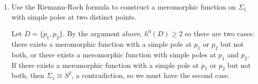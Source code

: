 \documentclass[11pt,oneside,english,reqno]{amsart}
\theoremstyle{definition}
\newcommand{\pspace}{\hspace{10mm}}
\begin{document}
\begin{enumerate}[leftmargin=*]
\begin{proof}
Let $D=\{p\}$. By the Riemann-Roch formula, we have
\[
h^0(D)-h^1(D)=d-g+1=d+1\pspace \iff \pspace h^0(D)=h^1(D)+d+1\geq1.
\]
The space of holomorphic functions (functions with not poles) has dimension 1, so it must be the case that $h^(0)\geq2$. Thus there exists at least one meromorphic function on $\Sigma_0$ with a simple pole at $p$.
\end{proof}

\pagebreak

\item Use the Riemann-Roch formula to construct a meromorphic function on $\Sigma_1$ with simple poles at two distinct points. 

Let $D=\{p_1,p_2\}$. By the argument above, $h^0(D)\geq2$ so there are two cases: there exists a meromorphic function with a simple pole at $p_1$ or $p_2$ but not both, or there exists a meromorphic function with simple poles at $p_1$ and $p_2$. If there exists a meromorphic function with a simple pole at $p_1$ or $p_2$ but not both, then $\Sigma_1\cong S^2$, a contradiction, so we must have the second case.

\end{enumerate}
\end{document}
